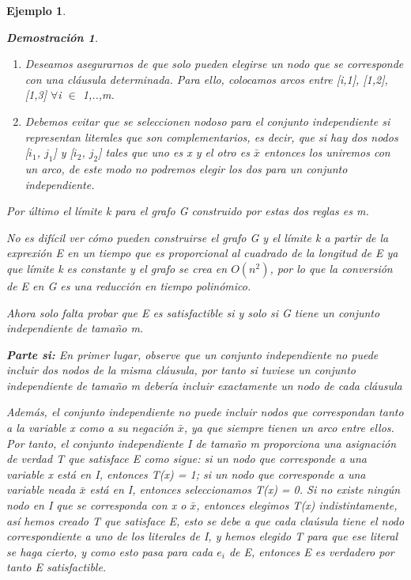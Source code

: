 \documentclass[a4paper,12pt,titlepage]{article}
\newtheorem{eje}{Ejemplo}[section]
\newtheorem*{dem}{\textbf{Demostraci\'on}}
\begin{document}
\begin{eje}
\begin{dem}
\begin{enumerate}

\item Deseamos asegurarnos de que solo pueden elegirse un nodo que se corresponde con una cl\'ausula determinada. Para ello, colocamos arcos entre [i,1], [1,2], [1,3] $\forall$i $\in$ {1,..,m}.

\item Debemos evitar que se seleccionen nodoso para el conjunto independiente si representan literales que son complementarios, es decir, que si hay dos nodos [$i_1$, $j_1$] y [$i_2$, $j_2$] tales que uno es x y el otro es $\bar{x}$ entonces los uniremos con un arco, de este modo no podremos elegir los dos para un conjunto independiente.

\end{enumerate}

Por \'ultimo el l\'imite k para el grafo G construido por estas dos reglas es m.

\vspace{\baselineskip}

No es dif\'icil ver c\'omo pueden construirse el grafo G y el l\'imite k a partir de la exprexi\'on E en un tiempo que es proporcional al cuadrado de la longitud de E ya que l\'imite k es constante y el grafo se crea en $O(n^2)$, por lo que la conversi\'on de E en G es una reducci\'on en tiempo polin\'omico.

\vspace{\baselineskip}

Ahora solo falta probar que E es satisfactible si y solo si G tiene un conjunto independiente de tamaño m.

\vspace{\baselineskip}

\textbf{Parte si:} En primer lugar, observe que un conjunto independiente no puede incluir dos nodos de la misma cl\'ausula, por tanto si tuviese un conjunto independiente de tamaño m deber\'ia incluir exactamente un nodo de cada cl\'ausula

Adem\'as, el conjunto independiente no puede incluir nodos que correspondan tanto a la variable x como a su negaci\'on $\bar{x}$, ya que siempre tienen un arco entre ellos. Por tanto, el conjunto independiente I de tamaño m proporciona una asignaci\'on  de verdad T que satisface E como sigue: si un nodo que corresponde a una variable x est\'a en I, entonces T(x) = 1; si un nodo que corresponde a una variable neada $\bar{x}$ est\'a en I, entonces seleccionamos T(x) = 0. Si no existe ning\'un nodo en I que se corresponda con x o $\bar{x}$, entonces elegimos T(x) indistintamente, as\'i hemos creado T que satisface E, esto se debe a que cada cla\'usula tiene el nodo correspondiente a uno de los literales de I, y hemos elegido T para que ese literal se haga cierto, y como esto pasa para cada $e_i$ de E, entonces E es verdadero por tanto E satisfactible.


\end{dem}
\end{eje}
\end{document}
